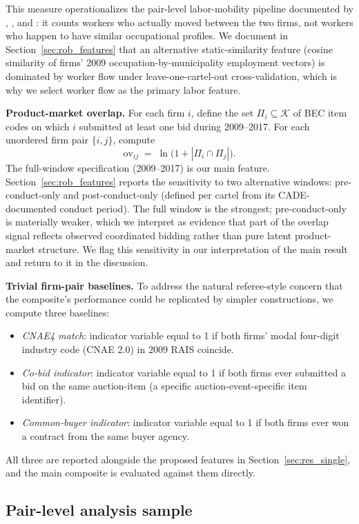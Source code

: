This measure operationalizes the pair-level labor-mobility pipeline documented by \citet{stoyanov2012worker}, \citet{jarosch2021learning}, and \citet{sorkin2018ranking}: it counts workers who actually moved between the two firms, not workers who happen to have similar occupational profiles. We document in Section~\ref{sec:rob_features} that an alternative static-similarity feature (cosine similarity of firms' 2009 occupation-by-municipality employment vectors) is dominated by worker flow under leave-one-cartel-out cross-validation, which is why we select worker flow as the primary labor feature.

\textbf{Product-market overlap.} For each firm $i$, define the set $\Pi_i \subseteq \mathcal{K}$ of BEC item codes on which $i$ submitted at least one bid during 2009--2017. For each unordered firm pair $\{i, j\}$, compute
\[
\mathrm{ov}_{ij} \;=\; \ln\bigl(1 + |\Pi_i \cap \Pi_j|\bigr).
\]
The full-window specification (2009--2017) is our main feature. Section~\ref{sec:rob_features} reports the sensitivity to two alternative windows: pre-conduct-only and post-conduct-only (defined per cartel from its CADE-documented conduct period). The full window is the strongest; pre-conduct-only is materially weaker, which we interpret as evidence that part of the overlap signal reflects observed coordinated bidding rather than pure latent product-market structure. We flag this sensitivity in our interpretation of the main result and return to it in the discussion.

\textbf{Trivial firm-pair baselines.} To address the natural referee-style concern that the composite's performance could be replicated by simpler constructions, we compute three baselines:
\begin{itemize}
\item \emph{CNAE4 match}: indicator variable equal to 1 if both firms' modal four-digit industry code (CNAE 2.0) in 2009 RAIS coincide.
\item \emph{Co-bid indicator}: indicator variable equal to 1 if both firms ever submitted a bid on the same auction-item (a specific auction-event-specific item identifier).
\item \emph{Common-buyer indicator}: indicator variable equal to 1 if both firms ever won a contract from the same buyer agency.
\end{itemize}
All three are reported alongside the proposed features in Section~\ref{sec:res_single}, and the main composite is evaluated against them directly.

\subsection{Pair-level analysis sample}\label{sec:data_sample}

